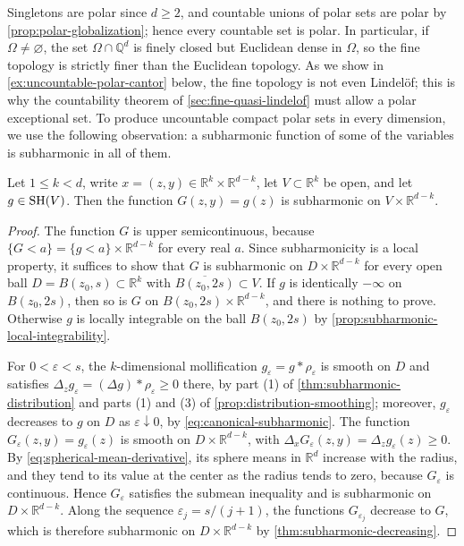 Singletons are polar since $d\geq2$, and countable unions of polar sets are polar by \cref{prop:polar-globalization}; hence every countable set is polar. In particular, if $\Omega\neq\varnothing$, the set $\Omega\cap\mathbb Q^d$ is finely closed but Euclidean dense in $\Omega$, so the fine topology is strictly finer than the Euclidean topology. As we show in \cref{ex:uncountable-polar-cantor} below, the fine topology is not even Lindel\"of; this is why the countability theorem of \cref{sec:fine-quasi-lindelof} must allow a polar exceptional set. To produce uncountable compact polar sets in every dimension, we use the following observation: a subharmonic function of some of the variables is subharmonic in all of them.

\begin{lemma}\label{lem:subharmonic-cylinder}
Let $1\leq k<d$, write $x=(z,y)\in\mathbb R^k\times\mathbb R^{d-k}$, let $V\subset\mathbb R^k$ be open, and let $g\in\mathrm{SH}(V)$. Then the function $G(z,y)=g(z)$ is subharmonic on $V\times\mathbb R^{d-k}$.
\end{lemma}
\begin{proof}
The function $G$ is upper semicontinuous, because $\{G<a\}=\{g<a\}\times\mathbb R^{d-k}$ for every real $a$. Since subharmonicity is a local property, it suffices to show that $G$ is subharmonic on $D\times\mathbb R^{d-k}$ for every open ball $D=B(z_0,s)\subset\mathbb R^k$ with $\overline{B(z_0,2s)}\subset V$. If $g$ is identically $-\infty$ on $B(z_0,2s)$, then so is $G$ on $B(z_0,2s)\times\mathbb R^{d-k}$, and there is nothing to prove. Otherwise $g$ is locally integrable on the ball $B(z_0,2s)$ by \cref{prop:subharmonic-local-integrability}.

For $0<\varepsilon<s$, the $k$-dimensional mollification $g_\varepsilon=g*\rho_\varepsilon$ is smooth on $D$ and satisfies $\Delta_zg_\varepsilon=(\Delta g)*\rho_\varepsilon\geq0$ there, by part (1) of \cref{thm:subharmonic-distribution} and parts (1) and (3) of \cref{prop:distribution-smoothing}; moreover, $g_\varepsilon$ decreases to $g$ on $D$ as $\varepsilon\downarrow0$, by \eqref{eq:canonical-subharmonic}. The function $G_\varepsilon(z,y)=g_\varepsilon(z)$ is smooth on $D\times\mathbb R^{d-k}$, with $\Delta_xG_\varepsilon(z,y)=\Delta_zg_\varepsilon(z)\geq0$. By \eqref{eq:spherical-mean-derivative}, its sphere means in $\mathbb R^d$ increase with the radius, and they tend to its value at the center as the radius tends to zero, because $G_\varepsilon$ is continuous. Hence $G_\varepsilon$ satisfies the submean inequality and is subharmonic on $D\times\mathbb R^{d-k}$. Along the sequence $\varepsilon_j=s/(j+1)$, the functions $G_{\varepsilon_j}$ decrease to $G$, which is therefore subharmonic on $D\times\mathbb R^{d-k}$ by \cref{thm:subharmonic-decreasing}.
\end{proof}

